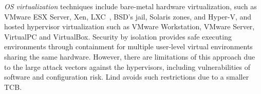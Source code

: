 
\textit{OS virtualization}
techniques include
bare-metal hardware virtualization, such as VMware ESX Server, Xen,
LXC~\cite{LXC}, BSD's jail, Solaris zones, and Hyper-V, and
hosted hypervisor virtualization such as VMware
Workstation, VMware Server, VirtualPC and VirtualBox.
%
Security by isolation \cite{Qubes, Overshadow, SecureVM, HypSec} 
provides safe executing environments through containment for multiple
user-level virtual environments sharing the same hardware. 
However, there are limitations of this approach due to
the large attack vectors against the hypervisors, including
vulnerabilities of software and configuration risk. Lind avoids such restrictions due to a smaller TCB.

